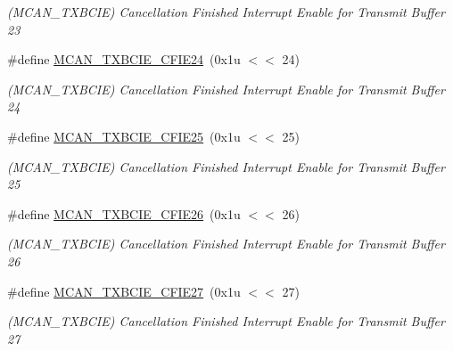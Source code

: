 \begin{DoxyCompactItemize}
\begin{DoxyCompactList}\small\item\em (M\+C\+A\+N\+\_\+\+T\+X\+B\+C\+IE) Cancellation Finished Interrupt Enable for Transmit Buffer 23 \end{DoxyCompactList}\item 
\mbox{\label{group__SAMV71__MCAN_gac5cfab8a731aab464b5010afe30f8d35}} 
\#define \mbox{\hyperlink{group__SAMV71__MCAN_gac5cfab8a731aab464b5010afe30f8d35}{M\+C\+A\+N\+\_\+\+T\+X\+B\+C\+I\+E\+\_\+\+C\+F\+I\+E24}}~(0x1u $<$$<$ 24)
\begin{DoxyCompactList}\small\item\em (M\+C\+A\+N\+\_\+\+T\+X\+B\+C\+IE) Cancellation Finished Interrupt Enable for Transmit Buffer 24 \end{DoxyCompactList}\item 
\mbox{\label{group__SAMV71__MCAN_ga14d380e3104995a3859fe7b3b6c8ea74}} 
\#define \mbox{\hyperlink{group__SAMV71__MCAN_ga14d380e3104995a3859fe7b3b6c8ea74}{M\+C\+A\+N\+\_\+\+T\+X\+B\+C\+I\+E\+\_\+\+C\+F\+I\+E25}}~(0x1u $<$$<$ 25)
\begin{DoxyCompactList}\small\item\em (M\+C\+A\+N\+\_\+\+T\+X\+B\+C\+IE) Cancellation Finished Interrupt Enable for Transmit Buffer 25 \end{DoxyCompactList}\item 
\mbox{\label{group__SAMV71__MCAN_ga074296efcc84e8b71c0e41c7f7be742a}} 
\#define \mbox{\hyperlink{group__SAMV71__MCAN_ga074296efcc84e8b71c0e41c7f7be742a}{M\+C\+A\+N\+\_\+\+T\+X\+B\+C\+I\+E\+\_\+\+C\+F\+I\+E26}}~(0x1u $<$$<$ 26)
\begin{DoxyCompactList}\small\item\em (M\+C\+A\+N\+\_\+\+T\+X\+B\+C\+IE) Cancellation Finished Interrupt Enable for Transmit Buffer 26 \end{DoxyCompactList}\item 
\mbox{\label{group__SAMV71__MCAN_ga7071a6f7080f82570110e17753d34113}} 
\#define \mbox{\hyperlink{group__SAMV71__MCAN_ga7071a6f7080f82570110e17753d34113}{M\+C\+A\+N\+\_\+\+T\+X\+B\+C\+I\+E\+\_\+\+C\+F\+I\+E27}}~(0x1u $<$$<$ 27)
\begin{DoxyCompactList}\small\item\em (M\+C\+A\+N\+\_\+\+T\+X\+B\+C\+IE) Cancellation Finished Interrupt Enable for Transmit Buffer 27 \end{DoxyCompactList}\item 

\end{DoxyCompactItemize}
